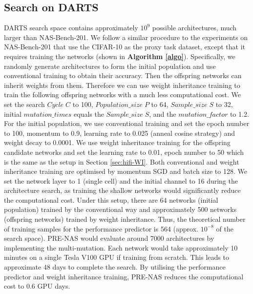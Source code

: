 \documentclass[sigconf]{acmart}
\begin{document}
\subsection{Search on DARTS}
DARTS search space contains approximately $10^9$ possible architectures, much larger than NAS-Bench-201.  We follow a similar procedure to the experiments on NAS-Bench-201 that use the CIFAR-10 as the proxy task dataset, except that it requires training the networks (shown in \textbf{Algorithm \ref{algo}}).  Specifically, we randomly generate architectures to form the initial population and use conventional training to obtain their accuracy.  Then the offspring networks can inherit weights from them. Therefore we can use weight inheritance training to train the following offspring networks with a much less computational cost. We set the search $Cycle \; C$ to 100, $Population\_size \; P$ to 64, $Sample\_size \; S$ to 32, initial $mutation\_times$ equals the $Sample\_size \; S$, and the $mutation\_factor$ to 1.2. For the initial population, we use conventional training and set the epoch number to 100, momentum to 0.9, learning rate to 0.025 (anneal cosine strategy) and weight decay to 0.0001. We use weight inheritance training for the offspring candidate networks and set the learning rate to 0.01, epoch number to 50 which is the same as the setup in Section \ref{sec:hifi-WI}. Both conventional and weight inheritance training are optimised by momentum SGD and batch size to 128.  We set the network layer to 1 (single cell) and the initial channel to 16 during the architecture search, as training the shallow networks would significantly reduce the computational cost.  Under this setup, there are 64 networks (initial population) trained by the conventional way and approximately 500 networks (offspring networks) trained by weight inheritance. Thus, the theoretical number of training samples for the performance predictor is 564 (approx. $10^{-8}$ of the search space).  PRE-NAS would evaluate around 7000 architectures by implementing the multi-mutation.  Each network would take approximately 10 minutes on a single Tesla V100 GPU if training from scratch. This leads to approximate 48 days to complete the search. By utilising the performance predictor and weight inheritance training, PRE-NAS reduces the computational cost to 0.6 GPU days.
\end{document}
